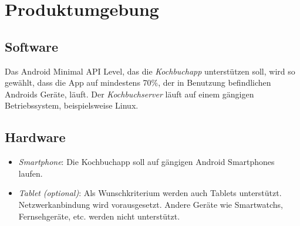 \chapter{Produktumgebung}

\section{Software}
Das Android Minimal API Level, das die {\em \gls{Kochbuchapp}} unterstützen soll, wird so gewählt, dass die App auf mindestens 70\%, der in Benutzung befindlichen \glspl{Android} Geräte, läuft.\newline 
Der {\em \gls{Kochbuchserver}} läuft auf einem gängigen Betriebssystem, beispielsweise Linux. 

\section{Hardware}
\begin{itemize}
	\item {\em Smartphone}: Die \gls{Kochbuchapp} soll auf gängigen \gls{Android} Smartphones laufen. 
	\item {\em Tablet} {\em (optional)}: Als Wunschkriterium werden auch Tablets unterstützt. 
	Netzwerkanbindung wird vorausgesetzt. 
	Andere Geräte wie \glspl{Smartwatch}, Fernsehgeräte, etc. werden nicht unterstützt. 
\end{itemize}



